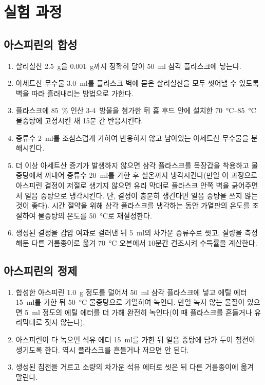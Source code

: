 \documentclass{GSHS-chemexp}
\begin{document}
	\section{실험 과정}
	
	\subsection{아스피린의 합성}
	\begin{enumerate}
		\item 살리실산 \SI{2.5}{\gram}을 \SI{0.001}{\gram}까지 정확히 달아
		\SI{50}{\milli\litre} 삼각 플라스크에 넣는다.
		\item 아세트산 무수물 \SI{3.0}{\milli\litre}를
		플라스크 벽에 묻은 살리실산을 모두 씻어낼 수 있도록
		벽을 따라 흘러내리는 방법으로 가한다.
		\item 플라스크에 \SI{85}{\percent} 인산 3-4~방울을 첨가한 뒤
		흄 후드 안에 설치한 \SIrange{70}{85}{\degreeCelsius} 물중탕에
		고정시킨 채 15분 간 반응시킨다.
		\item 증류수 \SI{2}{\milli\litre}를 조심스럽게 가하여
		반응하지 않고 남아있는 아세트산 무수물을 분해시킨다.
		\item 더 이상 아세트산 증기가 발생하지 않으면
		삼각 플라스크를 목장갑을 착용하고 물중탕에서 꺼내어
		증류수 \SI{20}{\milli\litre}를 가한 후
		실온까지 냉각시킨다(만일 이 과정으로 아스피린 결정이
		저절로 생기지 않으면 유리 막대로 플라스크 안쪽 벽을 긁어주면서
		얼음 중탕으로 냉각시킨다. 단, 결정이 충분히 생긴다면
		얼음 중탕을 쓰지 않는 것이 좋다).
		시간 절약을 위해 삼각 플라스크를 냉각하는 동안
		가열판의 온도를 조절하여 물중탕의 온도를
		\SI{50}{\degreeCelsius}로 재설정한다.
		\item 생성된 결정을 감압 여과로 걸러낸 뒤 \SI{5}{\milli\litre}의
		차가운 증류수로 씻고, 질량을 측정해둔 다른 거름종이로 옮겨
		\SI{70}{\degreeCelsius} 오븐에서 10분간 건조시켜 수득률을 계산한다.
	\end{enumerate}
	
	\subsection{아스피린의 정제}
	\begin{enumerate}
		\item 합성한 아스피린 \SI{1.0}{\gram} 정도를 덜어서
		\SI{50}{\milli\litre} 삼각 플라스크에 넣고
		에틸 에터 \SI{15}{\milli\litre}를 가한 뒤
		\SI{50}{\degreeCelsius} 물중탕으로 가열하여 녹인다.
		만일 녹지 않는 물질이 있으면 \SI{5}{\milli\litre} 정도의
		에틸 에터를 더 가해 완전히 녹인다(이 때 플라스크를 흔들거나
		유리막대로 젓지 않는다).
		\item 아스피린이 다 녹으면 석유 에터 \SI{15}{\milli\litre}를 가한 뒤
		얼음 중탕에 담가 두어 침전이 생기도록 한다.
		역시 플라스크를 흔들거나 저으면 안 된다.
		\item 생성된 침전을 거르고 소량의 차가운 석유 에터로 씻은 뒤
		다른 거름종이에 옮겨 말린다.
	\end{enumerate}
	
\end{document}

